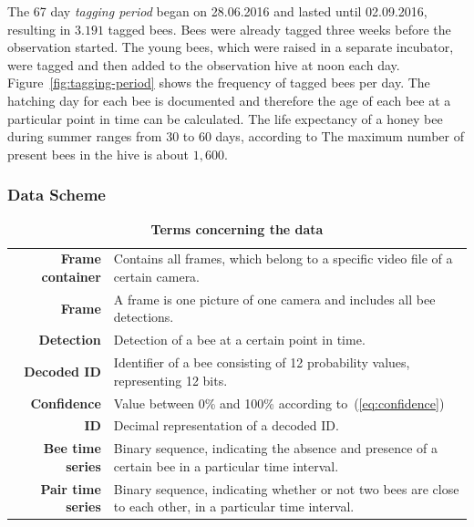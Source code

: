 The 67 day \emph{tagging period} began on 28.06.2016 and lasted until 02.09.2016, resulting in $3.191$ tagged bees.
Bees were already tagged three weeks before the observation started.
The young bees, which were raised in a separate incubator, were tagged and then added to the observation hive at noon each day.
Figure~\ref{fig:tagging-period} shows the frequency of tagged bees per day.
The hatching day for each bee is documented and therefore the age of each bee at a particular point in time can be calculated.
The life expectancy of a honey bee during summer ranges from 30 to 60 days, according to \textcite[p. 27]{menzel2016intelligenz}
The maximum number of present bees in the hive is about $1,600$.

\subsubsection{Data Scheme}
\label{subsec:datascheme}

\begin{table}[!t]
\small
\caption[Terms concerning the data]{\textbf{Terms concerning the data}}
\label{tab:dataset}
\vspace{3mm}
\colorbox{usethiscolorhere}{
\centering
\begin{tabularx}{\textwidth}{@{} r Y @{}}
	\textbf{Frame container} &
	Contains all frames, which belong to a specific video file of a certain camera.\vspace{2mm}\\
	\textbf{Frame} &
	A frame is one picture of one camera and includes all bee detections.\vspace{2mm}\\
	\textbf{Detection} &
	Detection of a bee at a certain point in time.\vspace{2mm}\\
	\textbf{Decoded ID} &
	Identifier of a bee consisting of 12 probability values, representing 12 bits.\vspace{2mm}\\
	\textbf{Confidence} &
	Value between 0\% and 100\% according to~(\ref{eq:confidence})\vspace{2mm}\\
	\textbf{ID} &
	Decimal representation of a decoded ID.\vspace{2mm}\\
	\textbf{Bee time series} & Binary sequence, indicating the absence and presence of a certain bee in a particular time interval.\vspace{2mm}\\
	\textbf{Pair time series} & Binary sequence, indicating whether or not two bees are close to each other, in a particular time interval.\vspace{2mm}\\
\end{tabularx}
}
\end{table}

